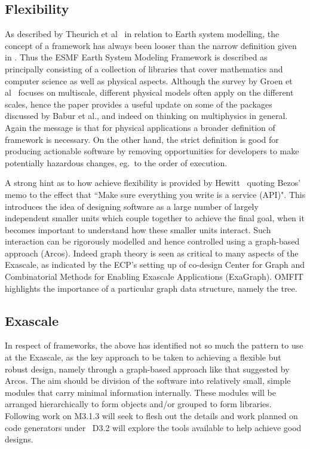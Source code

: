 \subsection{Flexibility}\label{sec:flex}
As described by Theurich et al~\cite{Th16eart} in relation to Earth system
modelling, the concept of a framework has always been looser than the narrow definition
given in . Thus the ESMF Earth System Modeling Framework is described 
as principally consisting of a collection of libraries that cover mathematics and
computer science as well as physical aspects.
Although the survey by Groen et al~\cite{Gr19Mast} focuses on multiscale, different
physical models often apply on the different scales, hence the paper provides
a useful update on some of the packages discussed by Babur et al., and indeed on thinking
on multiphysics in general. Again the message is that for physical applications a
broader definition of framework is necessary.
On the other hand, the strict definition is good for producing actionable software
by removing opportunities for developers to make potentially hazardous changes, eg.\ to
the order of execution.

A strong hint as to how achieve flexibility is provided by Hewitt~\cite[\S\,7]{hewitt}
quoting Bezos' memo to the effect that
``Make sure everything you write is a service (API)".
This introduces the idea of designing software as a large number of largely
independent smaller units which couple together to achieve the final goal,
when it becomes important to understand how these smaller units interact.
Such interaction can be rigorously modelled and hence controlled using a
graph-based approach (Arcos).
Indeed graph theory is seen as critical to many aspects of the Exascale,
as indicated by the ECP's setting up of
co-design Center for Graph and Combinatorial Methods for Enabling Exascale Applications (ExaGraph).
OMFIT highlights the importance of a particular graph data structure, namely the
tree.

\subsection{Exascale}\label{sec:exa}
In respect of frameworks, the above has identified not so much the pattern
to use at the Exascale, as the key approach to be taken to achieving a flexible
but robust design, namely through a graph-based approach like that suggested by Arcos.
The aim should be division of the software into relatively small, simple modules
that carry minimal information internally. These modules will
be arranged hierarchically to form objects and/or grouped to form libraries.
Following work on M3.1.3 will seek to flesh out the details and
work planned on code generators under \nep\ D3.2 will
explore the tools available to help achieve good designs.

